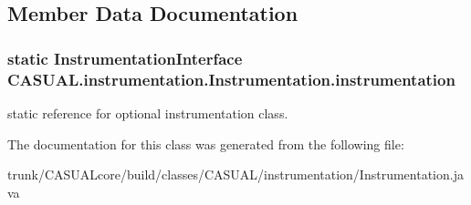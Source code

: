 \subsection{Member Data Documentation}
\hypertarget{class_c_a_s_u_a_l_1_1instrumentation_1_1_instrumentation_a8821cf89e9b9aa9936ee1fb91197e741}{
\subsubsection[{instrumentation}]{\setlength{\rightskip}{0pt plus 5cm}static {\bf Instrumentation\-Interface} C\-A\-S\-U\-A\-L.\-instrumentation.\-Instrumentation.\-instrumentation\hspace{0.3cm}{\ttfamily [static]}}}\label{class_c_a_s_u_a_l_1_1instrumentation_1_1_instrumentation_a8821cf89e9b9aa9936ee1fb91197e741}
static reference for optional instrumentation class. 

The documentation for this class was generated from the following file\-:\begin{DoxyCompactItemize}
\item 
trunk/\-C\-A\-S\-U\-A\-Lcore/build/classes/\-C\-A\-S\-U\-A\-L/instrumentation/Instrumentation.\-java\end{DoxyCompactItemize}
